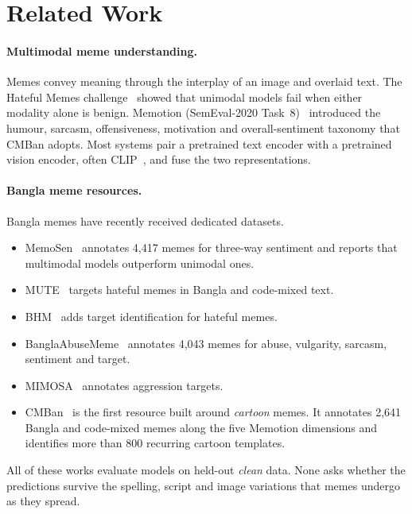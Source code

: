 \section{Related Work}
\label{sec:related}

\paragraph{Multimodal meme understanding.}
Memes convey meaning through the interplay of an image and overlaid text. The Hateful Memes
challenge~\cite{kiela2020hateful} showed that unimodal models fail when either modality alone is benign. Memotion
(SemEval-2020 Task~8)~\cite{sharma2020memotion} introduced the humour, sarcasm, offensiveness, motivation and
overall-sentiment taxonomy that CMBan adopts. Most systems pair a pretrained text encoder with a pretrained vision
encoder, often CLIP~\cite{radford2021clip}, and fuse the two representations.

\paragraph{Bangla meme resources.}
Bangla memes have recently received dedicated datasets.
\begin{itemize}
  \item MemoSen~\cite{hossain2022memosen} annotates 4{,}417 memes for three-way sentiment and reports that
  multimodal models outperform unimodal ones.
  \item MUTE~\cite{hossain2022mute} targets hateful memes in Bangla and code-mixed text.
  \item BHM~\cite{hossain2024bhm} adds target identification for hateful memes.
  \item BanglaAbuseMeme~\cite{das2023banglaabusememe} annotates 4{,}043 memes for abuse, vulgarity, sarcasm,
  sentiment and target.
  \item MIMOSA~\cite{ahsan2024mimosa} annotates aggression targets.
  \item CMBan~\cite{cmban2025} is the first resource built around \emph{cartoon} memes. It annotates 2{,}641
  Bangla and code-mixed memes along the five Memotion dimensions and identifies more than 800 recurring cartoon
  templates.
\end{itemize}
All of these works evaluate models on held-out \emph{clean} data. None asks whether the predictions survive the
spelling, script and image variations that memes undergo as they spread.

